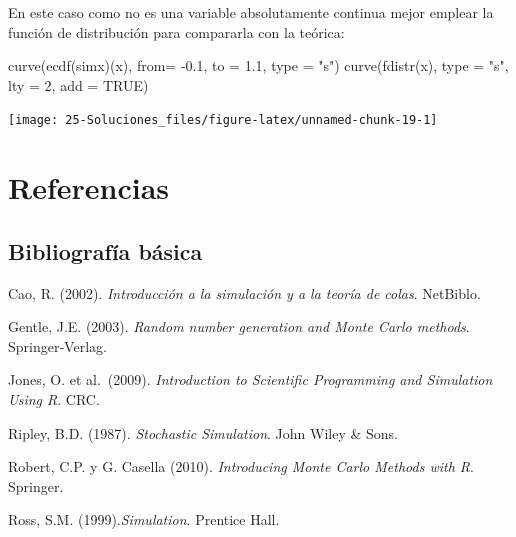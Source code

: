 \documentclass[
  10pt,
]{book}
\newenvironment{Shaded}{\begin{snugshade}}{\end{snugshade}}
\newcommand{\AttributeTok}[1]{\textcolor[rgb]{0.77,0.63,0.00}{#1}}
\newcommand{\ConstantTok}[1]{\textcolor[rgb]{0.00,0.00,0.00}{#1}}
\newcommand{\DecValTok}[1]{\textcolor[rgb]{0.00,0.00,0.81}{#1}}
\newcommand{\FloatTok}[1]{\textcolor[rgb]{0.00,0.00,0.81}{#1}}
\newcommand{\FunctionTok}[1]{\textcolor[rgb]{0.00,0.00,0.00}{#1}}
\newcommand{\NormalTok}[1]{#1}
\newcommand{\SpecialCharTok}[1]{\textcolor[rgb]{0.00,0.00,0.00}{#1}}
\newcommand{\StringTok}[1]{\textcolor[rgb]{0.31,0.60,0.02}{#1}}
\theoremstyle{break}
\theoremstyle{nonumberplain}
\begin{document}
\begin{enumerate}
  En este caso como no es una variable absolutamente continua mejor emplear
  la función de distribución para compararla con la teórica:

\begin{Shaded}
\begin{Highlighting}[]
\FunctionTok{curve}\NormalTok{(}\FunctionTok{ecdf}\NormalTok{(simx)(x), }\AttributeTok{from=} \SpecialCharTok{{-}}\FloatTok{0.1}\NormalTok{, }\AttributeTok{to =} \FloatTok{1.1}\NormalTok{, }\AttributeTok{type =} \StringTok{"s"}\NormalTok{)}
\FunctionTok{curve}\NormalTok{(}\FunctionTok{fdistr}\NormalTok{(x), }\AttributeTok{type =} \StringTok{"s"}\NormalTok{, }\AttributeTok{lty =} \DecValTok{2}\NormalTok{, }\AttributeTok{add =} \ConstantTok{TRUE}\NormalTok{)}
\end{Highlighting}
\end{Shaded}

  \begin{center}\texttt{[image: 25-Soluciones\_files/figure-latex/unnamed-chunk-19-1]} \end{center}
\end{enumerate}

\hypertarget{referencias}{%
\chapter*{Referencias}\label{referencias}}

\hypertarget{bibliografuxeda-buxe1sica}{%
\section*{Bibliografía básica}\label{bibliografuxeda-buxe1sica}}

Cao, R. (2002). \emph{Introducción a la simulación y a la teoría de colas}. NetBiblo.

Gentle, J.E. (2003). \emph{Random number generation and Monte Carlo methods}. Springer‐Verlag.

Jones, O. et al.~(2009). \emph{Introduction to Scientific Programming and Simulation Using R}. CRC.

Ripley, B.D. (1987). \emph{Stochastic Simulation}. John Wiley \& Sons.

Robert, C.P. y G. Casella (2010). \emph{Introducing Monte Carlo Methods with R}. Springer.

Ross, S.M. (1999).\emph{Simulation}. Prentice Hall.
\end{document}
